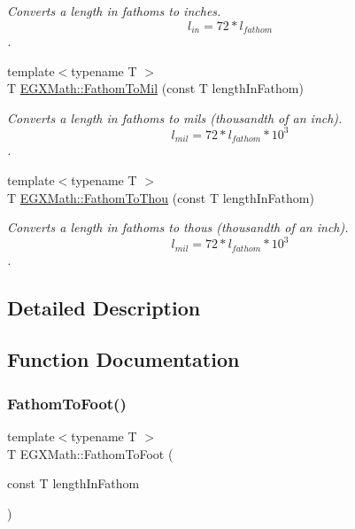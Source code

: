 \begin{DoxyCompactItemize}
\begin{DoxyCompactList}\small\item\em Converts a length in fathoms to inches. \[ l_{in}=72 * l_{fathom} \]. \end{DoxyCompactList}\item 
{\footnotesize template$<$typename T $>$ }\\T \mbox{\hyperlink{group___e_g_x_math-_conversions-_length_conversions-_nautical-_fathom-_imperial_ga1bdfdd0f208b878241772cc584fa4d1d}{E\+G\+X\+Math\+::\+Fathom\+To\+Mil}} (const T length\+In\+Fathom)
\begin{DoxyCompactList}\small\item\em Converts a length in fathoms to mils (thousandth of an inch). \[ l_{mil}=72 * l_{fathom} * 10^{3} \]. \end{DoxyCompactList}\item 
{\footnotesize template$<$typename T $>$ }\\T \mbox{\hyperlink{group___e_g_x_math-_conversions-_length_conversions-_nautical-_fathom-_imperial_ga869f851e88866f34c0dca73f1b69bb21}{E\+G\+X\+Math\+::\+Fathom\+To\+Thou}} (const T length\+In\+Fathom)
\begin{DoxyCompactList}\small\item\em Converts a length in fathoms to thous (thousandth of an inch). \[ l_{mil}=72 * l_{fathom} * 10^{3} \]. \end{DoxyCompactList}\end{DoxyCompactItemize}


\subsection{Detailed Description}


\subsection{Function Documentation}
\mbox{\label{group___e_g_x_math-_conversions-_length_conversions-_nautical-_fathom-_imperial_ga71995f5dd30211dc6c7c601d26a5fec8}} 
\subsubsection{\texorpdfstring{Fathom\+To\+Foot()}{FathomToFoot()}}
{\footnotesize\ttfamily template$<$typename T $>$ \\
T E\+G\+X\+Math\+::\+Fathom\+To\+Foot (\begin{DoxyParamCaption}\item[{const T}]{length\+In\+Fathom }\end{DoxyParamCaption})}



